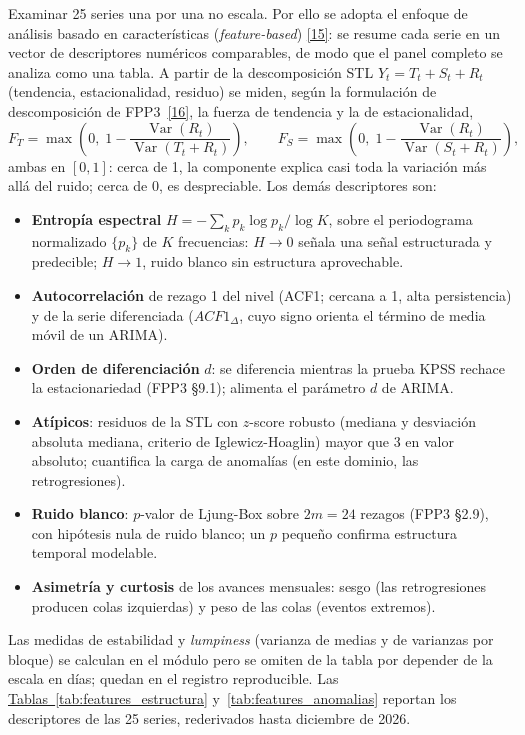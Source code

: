\documentclass[12pt,letterpaper]{report}
\newcommand{\cita}[1]{\hyperref[bib:#1]{[#1]}}
\begin{document}
Examinar 25 series una por una no escala. Por ello se adopta el enfoque de análisis
basado en características (\textit{feature-based}) \cita{15}: se resume cada serie en
un vector de descriptores numéricos comparables, de modo que el panel completo se
analiza como una tabla. A partir de la descomposición STL $Y_t = T_t + S_t + R_t$ (tendencia,
estacionalidad, residuo) se miden, según la formulación de descomposición de FPP3~\cita{16}, la
fuerza de tendencia y la de estacionalidad,
\begin{equation}
F_T = \max\!\left(0,\; 1 - \frac{\operatorname{Var}(R_t)}{\operatorname{Var}(T_t + R_t)}\right),
\qquad
F_S = \max\!\left(0,\; 1 - \frac{\operatorname{Var}(R_t)}{\operatorname{Var}(S_t + R_t)}\right),
\end{equation}
ambas en $[0,1]$: cerca de 1, la componente explica casi toda la variación más allá del ruido;
cerca de 0, es despreciable. Los demás descriptores son:
\begin{itemize}[leftmargin=*, itemsep=1pt, topsep=2pt]
\item \textbf{Entropía espectral} $H = -\sum_k p_k \log p_k / \log K$, sobre el periodograma
normalizado $\{p_k\}$ de $K$ frecuencias: $H \to 0$ señala una señal estructurada y predecible;
$H \to 1$, ruido blanco sin estructura aprovechable.
\item \textbf{Autocorrelación} de rezago 1 del nivel (ACF1; cercana a 1, alta persistencia) y de la
serie diferenciada ($ACF1_\Delta$, cuyo signo orienta el término de media móvil de un ARIMA).
\item \textbf{Orden de diferenciación} $d$: se diferencia mientras la prueba KPSS rechace la
estacionariedad (FPP3 §9.1); alimenta el parámetro $d$ de ARIMA.
\item \textbf{Atípicos}: residuos de la STL con $z$-score robusto (mediana y desviación absoluta
mediana, criterio de Iglewicz-Hoaglin) mayor que 3 en valor absoluto; cuantifica la carga de
anomalías (en este dominio, las retrogresiones).
\item \textbf{Ruido blanco}: $p$-valor de Ljung-Box sobre $2m=24$ rezagos (FPP3 §2.9), con hipótesis
nula de ruido blanco; un $p$ pequeño confirma estructura temporal modelable.
\item \textbf{Asimetría y curtosis} de los avances mensuales: sesgo (las retrogresiones producen
colas izquierdas) y peso de las colas (eventos extremos).
\end{itemize}
Las medidas de estabilidad y \textit{lumpiness} (varianza de medias y de varianzas por bloque) se
calculan en el módulo pero se omiten de la tabla por depender de la escala en días; quedan en el
registro reproducible. Las \hyperref[tab:features_estructura]{Tablas~\ref*{tab:features_estructura}} y~\ref{tab:features_anomalias}
reportan los descriptores de las 25 series, rederivados hasta diciembre de 2026.
\end{document}
